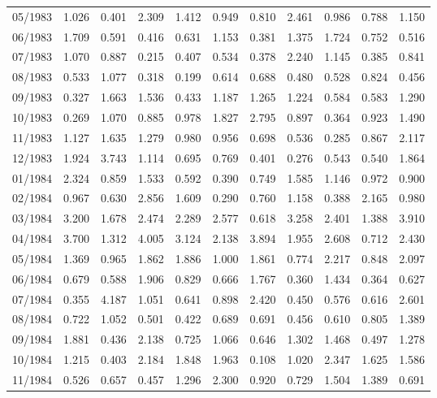 \begin{tabular}{lrrrrrrrrrr}
05/1983 &  1.026 &  0.401 &  2.309 &  1.412 &  0.949 &  0.810 &  2.461 &  0.986 &  0.788 &  1.150 \\
06/1983 &  1.709 &  0.591 &  0.416 &  0.631 &  1.153 &  0.381 &  1.375 &  1.724 &  0.752 &  0.516 \\
07/1983 &  1.070 &  0.887 &  0.215 &  0.407 &  0.534 &  0.378 &  2.240 &  1.145 &  0.385 &  0.841 \\
08/1983 &  0.533 &  1.077 &  0.318 &  0.199 &  0.614 &  0.688 &  0.480 &  0.528 &  0.824 &  0.456 \\
09/1983 &  0.327 &  1.663 &  1.536 &  0.433 &  1.187 &  1.265 &  1.224 &  0.584 &  0.583 &  1.290 \\
10/1983 &  0.269 &  1.070 &  0.885 &  0.978 &  1.827 &  2.795 &  0.897 &  0.364 &  0.923 &  1.490 \\
11/1983 &  1.127 &  1.635 &  1.279 &  0.980 &  0.956 &  0.698 &  0.536 &  0.285 &  0.867 &  2.117 \\
12/1983 &  1.924 &  3.743 &  1.114 &  0.695 &  0.769 &  0.401 &  0.276 &  0.543 &  0.540 &  1.864 \\
01/1984 &  2.324 &  0.859 &  1.533 &  0.592 &  0.390 &  0.749 &  1.585 &  1.146 &  0.972 &  0.900 \\
02/1984 &  0.967 &  0.630 &  2.856 &  1.609 &  0.290 &  0.760 &  1.158 &  0.388 &  2.165 &  0.980 \\
03/1984 &  3.200 &  1.678 &  2.474 &  2.289 &  2.577 &  0.618 &  3.258 &  2.401 &  1.388 &  3.910 \\
04/1984 &  3.700 &  1.312 &  4.005 &  3.124 &  2.138 &  3.894 &  1.955 &  2.608 &  0.712 &  2.430 \\
05/1984 &  1.369 &  0.965 &  1.862 &  1.886 &  1.000 &  1.861 &  0.774 &  2.217 &  0.848 &  2.097 \\
06/1984 &  0.679 &  0.588 &  1.906 &  0.829 &  0.666 &  1.767 &  0.360 &  1.434 &  0.364 &  0.627 \\
07/1984 &  0.355 &  4.187 &  1.051 &  0.641 &  0.898 &  2.420 &  0.450 &  0.576 &  0.616 &  2.601 \\
08/1984 &  0.722 &  1.052 &  0.501 &  0.422 &  0.689 &  0.691 &  0.456 &  0.610 &  0.805 &  1.389 \\
09/1984 &  1.881 &  0.436 &  2.138 &  0.725 &  1.066 &  0.646 &  1.302 &  1.468 &  0.497 &  1.278 \\
10/1984 &  1.215 &  0.403 &  2.184 &  1.848 &  1.963 &  0.108 &  1.020 &  2.347 &  1.625 &  1.586 \\
11/1984 &  0.526 &  0.657 &  0.457 &  1.296 &  2.300 &  0.920 &  0.729 &  1.504 &  1.389 &  0.691 \\

\end{tabular}
